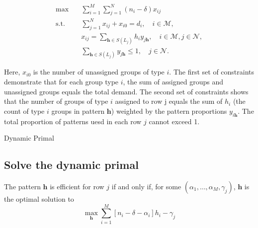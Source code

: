 \begin{equation}\label{improve_primal}
    \begin{aligned}
    \max \quad & \sum_{i=1}^M \sum_{j=1}^N\left(n_i-\delta\right) x_{i j} \\
    \text {s.t.} \quad & \sum_{j=1}^N x_{i j} + x_{i0} = d_i, \quad i \in \mathcal{M}, \\
    & x_{i j}=\sum_{\bm{h} \in S(L_{j})} h_i y_{j \bm{h}}, \quad i \in \mathcal{M}, j \in \mathcal{N}, \\
    & \sum_{\bm{h} \in S(L_{j})} y_{j \bm{h}} \leq 1, \quad j \in \mathcal{N}.
    \end{aligned}
\end{equation}

Here, $x_{i0}$ is the number of unassigned groups of type $i$. The first set of constraints demonstrate that for each group type $i$, the sum of assigned groups and unassigned groups equals the total demand. The second set of constraints shows that the number of groups of type $i$ assigned to row j equals the sum of $h_{i}$ (the count of type $i$ groups in pattern $\bm{h}$) weighted by the pattern proportions $y_{i \bm{h}}$. The total proportion of patterns uesd in each row $j$ cannot exceed 1.

\begin{algorithm}[H]
    \caption{Dynamic Primal}\label{algo_improve_primal}
\end{algorithm}


\subsection{Solve the dynamic primal}

The pattern $\bm{h}$ is efficient for row $j$ if and only if, for some $(\alpha_{1}, \ldots, \alpha_{M}, \gamma_{j})$, $\bm{h}$ is the optimal solution to $$\max_{\bm{h}} \sum_{i=1}^{M} [n_i - \delta - \alpha_{i}] h_{i} - \gamma_{j}$$

